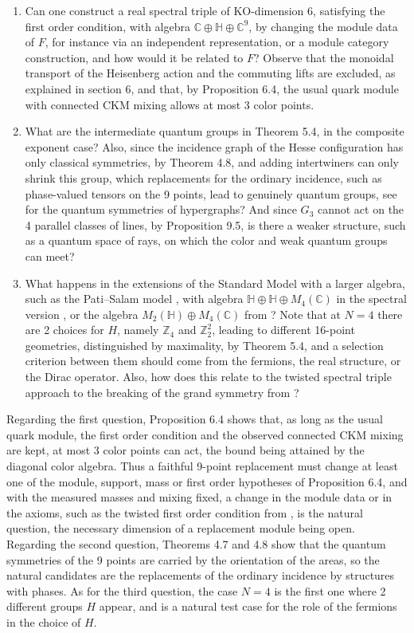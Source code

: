 \documentclass[11pt]{amsart}
\theoremstyle{definition}
\begin{document}
\begin{enumerate}
\item Can one construct a real spectral triple of KO-dimension $6$, satisfying the first order condition, with algebra $\mathbb C\oplus\mathbb H\oplus\mathbb C^9$, by changing the module data of $F$, for instance via an independent representation, or a module category construction, and how would it be related to $F$? Observe that the monoidal transport of the Heisenberg action and the commuting lifts are excluded, as explained in section 6, and that, by Proposition 6.4, the usual quark module with connected CKM mixing allows at most 3 color points.

\item What are the intermediate quantum groups in Theorem 5.4, in the composite exponent case? Also, since the incidence graph of the Hesse configuration has only classical symmetries, by Theorem 4.8, and adding intertwiners can only shrink this group, which replacements for the ordinary incidence, such as phase-valued tensors on the 9 points, lead to genuinely quantum groups, see \cite{far} for the quantum symmetries of hypergraphs? And since $G_3$ cannot act on the 4 parallel classes of lines, by Proposition 9.5, is there a weaker structure, such as a quantum space of rays, on which the color and weak quantum groups can meet?

\item What happens in the extensions of the Standard Model with a larger algebra, such as the Pati--Salam model \cite{psa}, with algebra $\mathbb H\oplus\mathbb H\oplus M_4(\mathbb C)$ in the spectral version \cite{ccs}, or the algebra $M_2(\mathbb H)\oplus M_4(\mathbb C)$ from \cite{cc1}? Note that at $N=4$ there are 2 choices for $H$, namely $\mathbb Z_4$ and $\mathbb Z_2^2$, leading to different 16-point geometries, distinguished by maximality, by Theorem 5.4, and a selection criterion between them should come from the fermions, the real structure, or the Dirac operator. Also, how does this relate to the twisted spectral triple approach to the breaking of the grand symmetry from \cite{dma}?
\end{enumerate}

Regarding the first question, Proposition 6.4 shows that, as long as the usual quark module, the first order condition and the observed connected CKM mixing are kept, at most 3 color points can act, the bound being attained by the diagonal color algebra. Thus a faithful 9-point replacement must change at least one of the module, support, mass or first order hypotheses of Proposition 6.4, and with the measured masses and mixing fixed, a change in the module data or in the axioms, such as the twisted first order condition from \cite{dma}, is the natural question, the necessary dimension of a replacement module being open. Regarding the second question, Theorems 4.7 and 4.8 show that the quantum symmetries of the 9 points are carried by the orientation of the areas, so the natural candidates are the replacements of the ordinary incidence by structures with phases. As for the third question, the case $N=4$ is the first one where 2 different groups $H$ appear, and is a natural test case for the role of the fermions in the choice of $H$.
\end{document}
